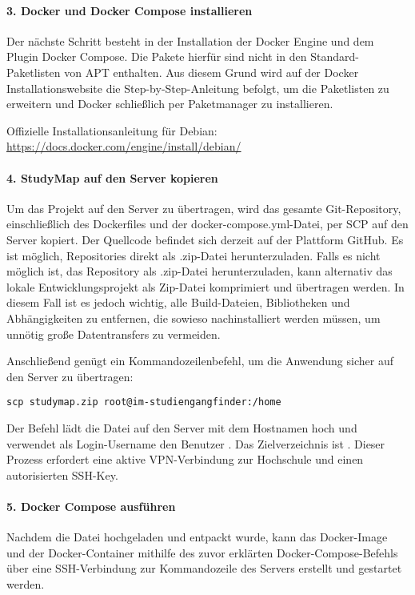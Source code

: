 \paragraph*{3. Docker und Docker Compose installieren}
Der nächste Schritt besteht in der Installation der Docker Engine und dem Plugin Docker Compose. Die Pakete hierfür sind nicht in den Standard-Paketlisten von APT enthalten. Aus diesem Grund wird auf der Docker Installationswebsite die Step-by-Step-Anleitung befolgt, um die Paketlisten zu erweitern und Docker schließlich per Paketmanager zu installieren.

\noindent
Offizielle Installationsanleitung für Debian: \url{https://docs.docker.com/engine/install/debian/}

\paragraph*{4. StudyMap auf den Server kopieren}
Um das Projekt auf den Server zu übertragen, wird das gesamte Git-Repository, einschließlich des Dockerfiles und der docker-compose.yml-Datei, per SCP auf den Server kopiert. Der Quellcode befindet sich derzeit auf der Plattform GitHub. Es ist möglich, Repositories direkt als .zip-Datei herunterzuladen. Falls es nicht möglich ist, das Repository als .zip-Datei herunterzuladen, kann alternativ das lokale Entwicklungsprojekt als Zip-Datei komprimiert und übertragen werden. In diesem Fall ist es jedoch wichtig, alle Build-Dateien, Bibliotheken und Abhängigkeiten zu entfernen, die sowieso nachinstalliert werden müssen, um unnötig große Datentransfers zu vermeiden.

Anschließend genügt ein Kommandozeilenbefehl, um die Anwendung sicher auf den Server zu übertragen:
\begin{lstlisting}[style=Python]
scp studymap.zip root@im-studiengangfinder:/home
\end{lstlisting}

Der Befehl lädt die Datei  auf den Server mit dem Hostnamen  hoch und verwendet als Login-Username den Benutzer . Das Zielverzeichnis ist . Dieser Prozess erfordert eine aktive VPN-Verbindung zur Hochschule und einen autorisierten SSH-Key. %

\paragraph*{5. Docker Compose ausführen}
Nachdem die Datei hochgeladen und entpackt wurde, kann das Docker-Image und der Docker-Container mithilfe des zuvor erklärten Docker-Compose-Befehls über eine SSH-Verbindung zur Kommandozeile des Servers erstellt und gestartet werden.

